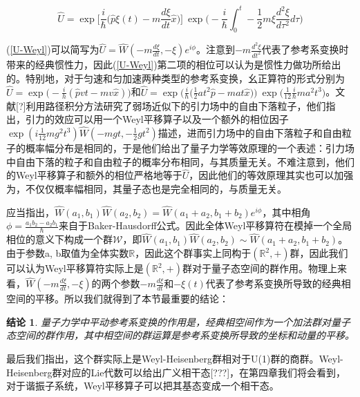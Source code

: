 \documentclass[a4paper]{article}
\newtheorem*{conclusion}{结论}
\begin{document}
        \begin{equation}\label{U-Weyl}
            \hat{U} = \exp\bigg[\frac{i}{\hbar}\bigg(\hat{p}\xi(t)-m\frac{d\xi}{dt}\hat{x} \bigg) \bigg]\ \exp\bigg( -\frac{i}{\hbar}\int_0^t-\frac{1}{2}m\xi\frac{d^2\xi}{d\tau^2} d\tau\bigg)
        \end{equation}

        (\ref{U-Weyl})可以简写为$\hat{U}=\hat{W}(-m\frac{d\xi}{dt},-\xi)e^{i\phi}$。注意到$-m\frac{d^2\xi}{dt^2}$代表了参考系变换时带来的经典惯性力，因此(\ref{U-Weyl})第二项的相位可以认为是惯性力做功所给出的。特别地，对于匀速和匀加速两种类型的参考系变换，幺正算符的形式分别为$\hat{U}=\exp\big(-\frac{i}{h}(\hat{p}vt-mv\hat{x})\big)$和$\hat{U}=\exp\big(\frac{i}{\hbar}\big(\frac{1}{2}at^2\hat{p}-mat\hat{x} \big)\big)\ \exp\big(\frac{1}{12}\frac{i}{\hbar}ma^2t^3\big)$。文献[?]利用路径积分方法研究了弱场近似下的引力场中的自由下落粒子，他们指出，引力的效应可以用一个Weyl平移算子以及一个额外的相位因子$\exp(i\frac{1}{12}mg^2t^3)\hat{W}(-mgt,-\frac{1}{2}gt^2)$描述，进而引力场中的自由下落粒子和自由粒子的概率幅分布是相同的，于是他们给出了量子力学等效原理的一个表述：引力场中自由下落的粒子和自由粒子的概率分布相同，与其质量无关。不难注意到，他们的Weyl平移算子和额外的相位严格地等于$\hat{U}$，因此他们的等效原理其实也可以加强为，不仅仅概率幅相同，其量子态也是完全相同的，与质量无关。

        应当指出，$\hat{W}(a_1, b_1)\hat{W}(a_2, b_2)=\hat{W}(a_1+a_2, b_1+b_2)e^{i\phi}$，其中相角$\phi=\frac{a_1b_2-a_2b_1}{\hbar}$来自于Baker-Hausdorff公式。因此全体Weyl平移算符在模掉一个全局相位的意义下构成一个群$\mathcal{W}$，即$\hat{W}(a_1, b_1)\hat{W}(a_2, b_2)\sim\hat{W}(a_1+a_2, b_1+b_2)$。由于参数a, b取值为全体实数$\mathbb{R}$，因此这个群事实上同构于$(\mathbb{R}^2,+)$群，因此我们可以认为Weyl平移算符实际上是$(\mathbb{R}^2,+)$群对于量子态空间的群作用。物理上来看，$\hat{W}(-m\frac{d\xi}{dt}, -\xi)$的两个参数$-m\frac{d\xi}{dt}$和$-\xi(t)$代表了参考系变换所导致的经典相空间的平移。所以我们就得到了本节最重要的结论：

        \begin{conclusion}
            量子力学中平动参考系变换的作用是，经典相空间作为一个加法群对量子态空间的群作用，其中相空间的群运算是参考系变换所导致的坐标和动量的平移。
        \end{conclusion}
    
        最后我们指出，这个群实际上是Weyl-Heisenberg群相对于U(1)群的商群。Weyl-Heisenberg群对应的Lie代数可以给出广义相干态[???]，在第四章我们将会看到，对于谐振子系统，Weyl平移算子可以把其基态变成一个相干态。
\end{document}
